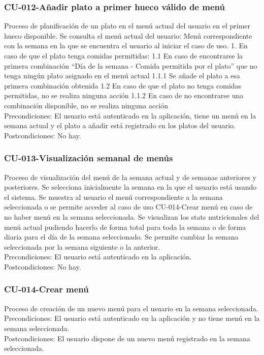 \documentclass[12pt, a4paper, twoside]{book}
\begin{document}
	\subsubsection{CU-012-Añadir plato a primer hueco válido de menú}
	Proceso de planificación de un plato en el menú actual del usuario en el primer hueco disponible.
	Se consulta el menú actual del usuario: Menú correspondiente con la semana en la que se encuentra el usuario al iniciar el caso de uso.
	1. En caso de que el plato tenga comidas permitidas:
	1.1 En caso de encontrarse la primera combinación ``Día de la semana - Comida permitida por el plato'' que no tenga ningún plato asignado en el menú actual
	1.1.1 Se añade el plato a esa primera combinación obtenida
	1.2 En caso de que el plato no tenga comidas permitidas, no se realiza ninguna acción
	1.1.2 En caso de no encontrarse una combinación disponible, no se realiza ninguna acción\\
	Precondiciones: El usuario está autenticado en la aplicación, tiene un menú en la semana actual y el plato a añadir está registrado en los platos del usuario.\\
	Postcondiciones: No hay.
	\subsubsection{CU-013-Visualización semanal de menús}
	Proceso de visualización del menú de la semana actual y de semanas anteriores y posteriores.
	Se selecciona inicialmente la semana en la que el usuario está usando el sistema.
	Se muestra al usuario el menú correspondiente a la semana seleccionada o se permite acceder al caso de uso CU-014-Crear menú en caso de no haber menú en la semana seleccionada.
	Se visualizan los stats nutricionales del menú actual pudiendo hacerlo de forma total para toda la semana o de forma diaria para el día de la semana seleccionado.
	Se permite cambiar la semana seleccionada por la semana siguiente o la anterior.\\
	Precondiciones: El usuario está autenticado en la aplicación.\\
	Postcondiciones: No hay.
	\subsubsection{CU-014-Crear menú}
	Proceso de creación de un nuevo menú para el usuario en la semana seleccionada.\\
	Precondiciones: El usuario está autenticado en la aplicación y no tiene menú en la semana seleccionada.\\
	Postcondiciones: El usuario dispone de un nuevo menú registrado en la semana seleccionada.
\end{document}
